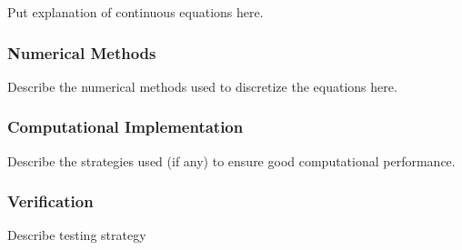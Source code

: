Put explanation of continuous equations here.

\subsubsection{Numerical Methods}

Describe the numerical methods used to discretize the equations here.

\subsubsection{Computational Implementation}

Describe the strategies used (if any) to ensure good computational performance.

\subsubsection{Verification}

Describe testing strategy



